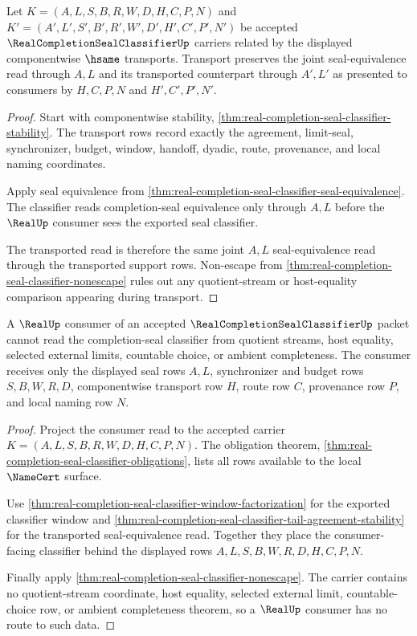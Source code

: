 \begin{theorem}
\label{thm:real-completion-seal-classifier-tail-agreement-stability}
Let $K=(A,L,S,B,R,W,D,H,C,P,N)$ and $K'=(A',L',S',B',R',W',D',H',C',P',N')$ be accepted $\RealCompletionSealClassifierUp$ carriers related by the displayed componentwise $\hsame$ transports. Transport preserves the joint seal-equivalence read through $A,L$ and its transported counterpart through $A',L'$ as presented to consumers by $H,C,P,N$ and $H',C',P',N'$.
\end{theorem}
\begin{proof}
Start with componentwise stability, \autoref{thm:real-completion-seal-classifier-stability}. The transport rows record exactly the agreement, limit-seal, synchronizer, budget, window, handoff, dyadic, route, provenance, and local naming coordinates.

Apply seal equivalence from \autoref{thm:real-completion-seal-classifier-seal-equivalence}. The classifier reads completion-seal equivalence only through $A,L$ before the $\RealUp$ consumer sees the exported seal classifier.

The transported read is therefore the same joint $A,L$ seal-equivalence read through the transported support rows. Non-escape from \autoref{thm:real-completion-seal-classifier-nonescape} rules out any quotient-stream or host-equality comparison appearing during transport.
\end{proof}

\begin{theorem}
\label{thm:real-completion-seal-classifier-realup-nonescape}
A $\RealUp$ consumer of an accepted $\RealCompletionSealClassifierUp$ packet cannot read the completion-seal classifier from quotient streams, host equality, selected external limits, countable choice, or ambient completeness. The consumer receives only the displayed seal rows $A,L$, synchronizer and budget rows $S,B,W,R,D$, componentwise transport row $H$, route row $C$, provenance row $P$, and local naming row $N$.
\end{theorem}
\begin{proof}
Project the consumer read to the accepted carrier $K=(A,L,S,B,R,W,D,H,C,P,N)$. The obligation theorem, \autoref{thm:real-completion-seal-classifier-obligations}, lists all rows available to the local $\NameCert$ surface.

Use \autoref{thm:real-completion-seal-classifier-window-factorization} for the exported classifier window and \autoref{thm:real-completion-seal-classifier-tail-agreement-stability} for the transported seal-equivalence read. Together they place the consumer-facing classifier behind the displayed rows $A,L,S,B,W,R,D,H,C,P,N$.

Finally apply \autoref{thm:real-completion-seal-classifier-nonescape}. The carrier contains no quotient-stream coordinate, host equality, selected external limit, countable-choice row, or ambient completeness theorem, so a $\RealUp$ consumer has no route to such data.
\end{proof}

